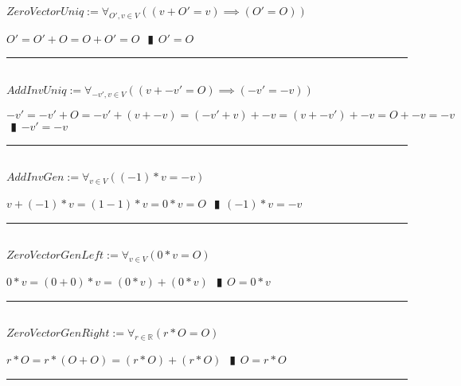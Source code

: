 \documentclass{book}
\newcommand{\abr}{:=}
\newcommand{\pipe}{$\phantom{(}\vrectangleblack\phantom{)}$}
\newcommand{\pr}[1]{\left(#1\right)}
\begin{document}
$ZeroVectorUniq \abr \forall_{O', v \in V}\pr{(v + O' = v) \implies (O' = O)}$
\begin{enumerate}
  \lit $O' = O' + O = O + O' = O$ \pipe $O' = O$
\end{enumerate} \vspace{.75mm} \hrule \vspace{.75mm} \ \\ 

$AddInvUniq \abr \forall_{-v', v \in V}\pr{(v + -v' = O) \implies (-v' = -v)}$
\begin{enumerate}
  \lit $-v' = -v' + O = -v' + (v + -v) = (-v' + v) + -v = (v + -v') + -v = O + -v = -v$ \pipe $-v' = -v$
\end{enumerate} \vspace{.75mm} \hrule \vspace{.75mm} \ \\ 

$AddInvGen \abr \forall_{v \in V}\pr{(-1) * v = -v}$
\begin{enumerate}
  \lit $v + (-1) * v = (1 - 1) * v = 0 * v = O$ \pipe $(-1) * v = -v$
\end{enumerate} \vspace{.75mm} \hrule \vspace{.75mm} \ \\ 

$ZeroVectorGenLeft \abr \forall_{v \in V}(0 * v = O)$
\begin{enumerate}
  \lit $0 * v = (0 + 0) * v = (0 * v) + (0 * v)$ \pipe $O = 0 * v$
\end{enumerate} \vspace{.75mm} \hrule \vspace{.75mm} \ \\ 

$ZeroVectorGenRight \abr \forall_{r \in \mathbb{R}}(r * O = O)$
\begin{enumerate}
  \lit $r * O = r * (O + O) = (r * O) + (r * O)$ \pipe $O = r * O$
\end{enumerate} \vspace{.75mm} \hrule \vspace{.75mm} \ \\ 
\end{document}
